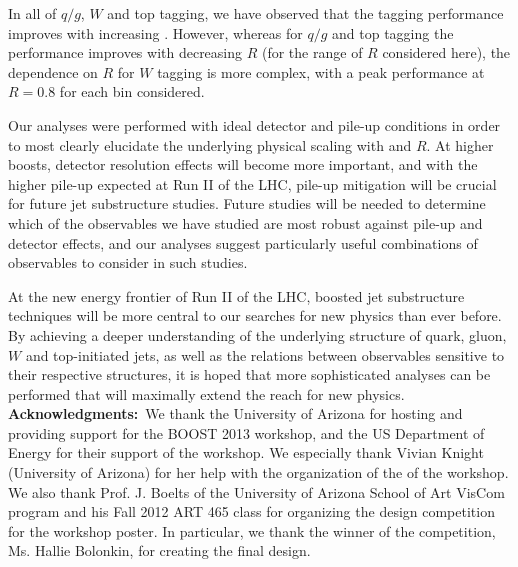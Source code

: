 In all of $q/g$, $W$ and top tagging, we have observed that the tagging performance improves with increasing \pt. However, whereas for $q/g$ and top tagging the performance improves with decreasing $R$ (for the range of $R$ considered here), the dependence on $R$ for $W$ tagging is more complex, with a peak performance at $R=0.8$ for each \pt bin considered. 

Our analyses were performed with ideal detector and pile-up conditions in order to most clearly elucidate the underlying physical scaling with \pt and $R$. At higher boosts, detector resolution effects will become more important, and with the higher pile-up expected at Run II of the LHC, pile-up mitigation will be crucial for future jet substructure studies. Future studies will be needed to determine which of the observables we have studied are most robust against pile-up and detector effects, and our analyses suggest particularly useful combinations of observables to consider in such studies. 

At the new energy frontier of Run II of the LHC, boosted jet substructure techniques will be more central to our searches for new physics than ever before. By achieving a deeper understanding of the underlying structure of quark, gluon, $W$ and top-initiated jets, as well as the relations between observables sensitive to their respective structures, it is hoped that more sophisticated analyses can be performed that will maximally extend the reach for new physics.\\

{\bf Acknowledgments:}~We thank the University of Arizona for hosting and providing support for the BOOST 2013 workshop, and the US Department of Energy for their support of the workshop.  We especially thank Vivian Knight (University of Arizona)
for her help with the organization of the of the workshop.  
We also thank Prof. J. Boelts of the University of Arizona School of Art VisCom program and his Fall 2012 ART 465 class for organizing the design competition for the workshop 
poster. In particular, we thank the winner of the competition, Ms. Hallie Bolonkin, for creating the final design.
